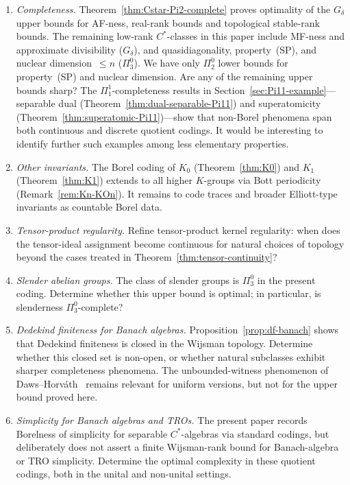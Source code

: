 \documentclass[12pt,fleqn,a4paper]{amsart}
\renewcommand{\le}{\leqslant}
\numberwithin{equation}{section}
\theoremstyle{definition}
\begin{document}
\begin{enumerate}
\item \emph{Completeness.}
Theorem~\ref{thm:Cstar-Pi2-complete} proves optimality of the $G_\delta$ upper bounds
for AF-ness, real-rank bounds and topological stable-rank bounds.  The remaining
low-rank $C^*$-classes in this paper include MF-ness and approximate divisibility
($G_\delta$), and quasidiagonality, property~(SP), and nuclear dimension~$\le n$
($\Pi^0_3$).  We have only $\Pi^0_2$ lower bounds for property~(SP) and nuclear
dimension.  Are any of the remaining upper bounds sharp?
The $\Pi^1_1$-completeness results in Section~\ref{sec:Pi11-example}---separable
dual (Theorem~\ref{thm:dual-separable-Pi11}) and superatomicity
(Theorem~\ref{thm:superatomic-Pi11})---show that non-Borel phenomena span both
continuous and discrete quotient codings.  It would be interesting to identify further
such examples among less elementary properties.

\item \emph{Other invariants.}
The Borel coding of $K_0$ (Theorem~\ref{thm:K0}) and $K_1$ (Theorem~\ref{thm:K1})
extends to all higher $K$-groups via Bott periodicity (Remark~\ref{rem:Kn-KOn}).
It remains to code traces and broader Elliott-type invariants as countable Borel data.

\item \emph{Tensor-product regularity.}
Refine tensor-product kernel regularity: when does the tensor-ideal
assignment become continuous for natural choices of topology beyond
the cases treated in Theorem~\ref{thm:tensor-continuity}?

\item \emph{Slender abelian groups.}
The class of slender groups is $\Pi^0_3$ in the present
coding.  Determine whether this upper bound is optimal; in particular, is
slenderness $\Pi^0_3$-complete?

\item \emph{Dedekind finiteness for Banach algebras.}
Proposition~\ref{prop:df-banach} shows that Dedekind finiteness is closed in the
Wijsman topology.  Determine whether this closed set is non-open, or whether natural
subclasses exhibit sharper completeness phenomena.  The unbounded-witness phenomenon
of Daws--Horv\'ath~\cite{DawsHorvathCJM} remains relevant for uniform versions, but
not for the upper bound proved here.

\item \emph{Simplicity for Banach algebras and TROs.}
The present paper records Borelness of simplicity for separable $C^*$-algebras via
standard codings, but deliberately does not assert a finite Wijsman-rank bound for
Banach-algebra or TRO simplicity.  Determine the optimal complexity in these quotient
codings, both in the unital and non-unital settings.


\end{enumerate}
\end{document}
